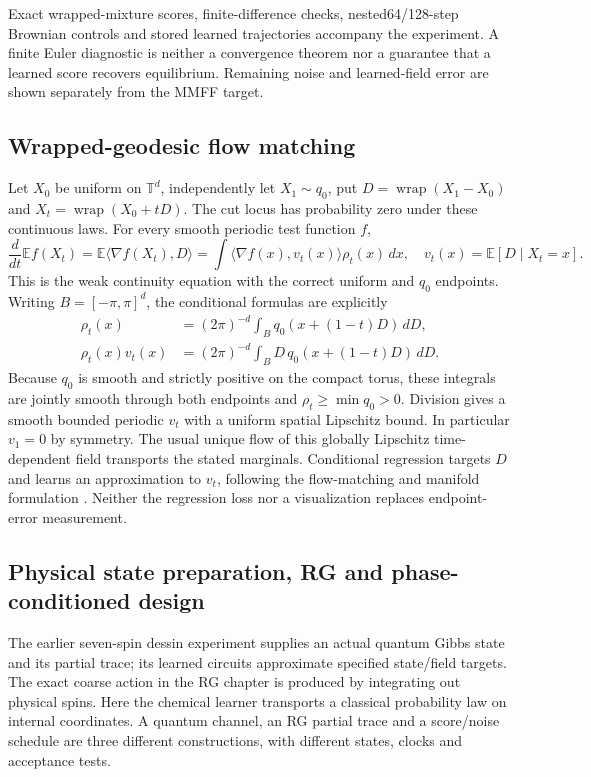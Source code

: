 \documentclass[11pt,oneside,openany]{book}
\theoremstyle{definition}\newtheorem{definition}[theorem]{Definition}
\theoremstyle{remark}\newtheorem{remark}[theorem]{Remark}
\begin{document}
Exact wrapped-mixture scores, finite-difference checks, nested64/128-step
Brownian controls and stored learned trajectories accompany the experiment.
A finite Euler diagnostic is neither a convergence theorem nor a guarantee
that a learned score recovers equilibrium. Remaining noise and learned-field
error are shown separately from the MMFF target.

\subsection{Wrapped-geodesic flow matching}
Let $X_0$ be uniform on $\mathbb T^d$, independently let $X_1\sim q_0$, put
$D=\operatorname{wrap}(X_1-X_0)$ and
$X_t=\operatorname{wrap}(X_0+tD)$. The cut locus has probability zero under
these continuous laws. For every smooth periodic test function $f$,
\[
 \frac d{dt}\mathbb Ef(X_t)
 =\mathbb E\langle\nabla f(X_t),D\rangle
 =\int\langle\nabla f(x),v_t(x)\rangle\rho_t(x)\,dx,
 \quad v_t(x)=\mathbb E[D\mid X_t=x].
\]
This is the weak continuity equation with the correct uniform and $q_0$
endpoints. Writing $B=[-\pi,\pi]^d$, the conditional formulas are explicitly
\[
 \begin{aligned}
 \rho_t(x)&=(2\pi)^{-d}\int_Bq_0(x+(1-t)D)\,dD,\\
 \rho_t(x)v_t(x)&=(2\pi)^{-d}\int_BD\,q_0(x+(1-t)D)\,dD.
 \end{aligned}
\]
Because $q_0$ is smooth and strictly positive on the compact torus,
these integrals are jointly smooth through both endpoints and
$\rho_t\ge\min q_0>0$. Division gives a smooth bounded periodic $v_t$
with a uniform spatial Lipschitz bound. In particular $v_1=0$ by symmetry. The usual unique flow of this globally Lipschitz
time-dependent field transports the stated marginals. Conditional regression
targets $D$ and learns an approximation to $v_t$, following the flow-matching
and manifold formulation \cite{VisFlow,VisRFM}. Neither the regression loss
nor a visualization replaces endpoint-error measurement.

\subsection{Physical state preparation, RG and phase-conditioned design}
The earlier seven-spin dessin experiment supplies an actual quantum Gibbs
state and its partial trace; its learned circuits approximate specified
state/field targets. The exact coarse action in the RG chapter is produced
by integrating out physical spins. Here the chemical learner transports a
classical probability law on internal coordinates. A quantum channel, an RG
partial trace and a score/noise schedule are three different constructions,
with different states, clocks and acceptance tests.
\end{document}
